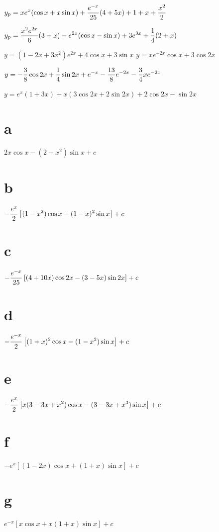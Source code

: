   $y_{p}=\displaystyle{xe^{x}(\cos x+x\sin
x)+\frac{e^{-x}}{25}(4+5x)+1+x+\frac{x^{2}}{2}}$

$y_{p}=\displaystyle{\frac{x^{2}e^{2x}}{6}(3+x)-e^{2x}(\cos x-\sin
x)+3e^{3x}+\frac{1}{4}(2+x)}$

 $y=(1-2x+3x^{2})e^{2x}+4\cos x+3\sin x$
$y=xe^{-2x}\cos x+3\cos2x$

$y=\displaystyle{-\frac{3}{8}\cos2x+\frac{1}{4}\sin2x+e^{-x}-\frac{13}{8}e^{-2x}-
\frac{3}{4}xe^{-2x}}$

 $y=e^{x}(1+3x)+x(3\cos2x+2\sin2x)+2\cos2x-\sin2x$  \part{a} $2x\cos x-(2-x^{2})\sin x+c$
\part{b} $-\displaystyle\frac{e^{x}}{2}\left[(1-x^{2})\cos x-(1-x)^{2}\sin x
\right]+c$

\quad\;  \;  \part{c} $-\displaystyle\frac{e^{-x}}{25}\left[(4+10x)\cos
2x-(3-5x)\sin2x\right]+c$

\quad\;  \;  \part{d} $-\displaystyle\frac{e^{-x}}{2}\left[(1+x)^{2}\cos x-(1-x^{2})\sin x
\right]+c$

\quad\;  \;  \part{e} $-\displaystyle\frac{e^{x}}{2}\left[x(3-3x+x^{2})\cos x-(3-3x+x^{3})\sin
x\right]+c$

\quad\;  \;  \part{f} $-e^{x}\left[(1-2x)\cos x+(1+x)\sin x\right]+c$
\part{g} $e^{-x}\left[x\cos x+x(1+x)\sin x\right]+c$

